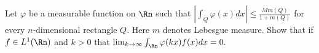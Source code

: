 Let $\varphi$ be a measurable function on $\Rn$ such that
$|\int_Q\varphi(x)dx| \leq \frac{M m(Q)}{1+m(Q)}$ for every
$n$-dimensional rectangle $Q$. Here $m$ denotes Lebesgue measure.
Show that if $f\in L^1(\Rn)$ and $k>0$ that 
$\lim_{k\rightarrow \infty}\int_{\Rn}\varphi(kx)f(x) dx=0.$

